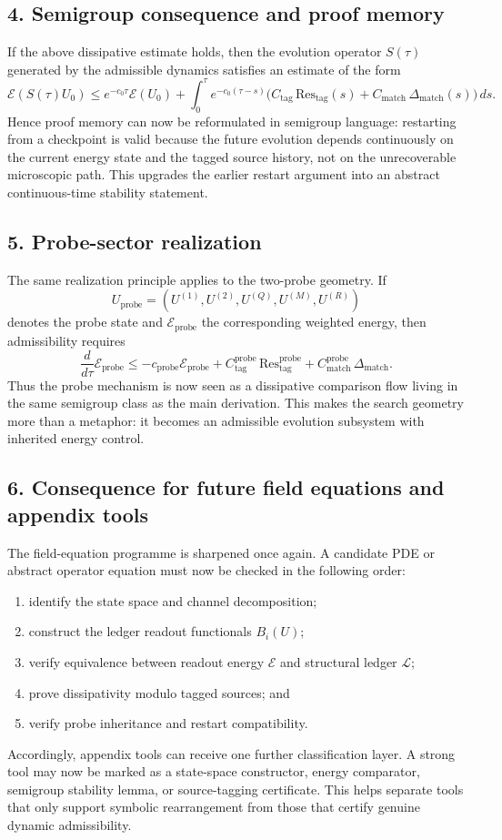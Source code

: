 \subsection*{4. Semigroup consequence and proof memory}
If the above dissipative estimate holds, then the evolution operator $S(\tau)$
generated by the admissible dynamics satisfies an estimate of the form
\[
\mathcal E(S(\tau)U_0)
\le e^{-c_0\tau}\mathcal E(U_0)
+\int_0^\tau e^{-c_0(\tau-s)}
\bigl(C_{\mathrm{tag}}\,\mathrm{Res}_{\mathrm{tag}}(s)
+ C_{\mathrm{match}}\,\Delta_{\mathrm{match}}(s)\bigr)\,ds.
\]
Hence proof memory can now be reformulated in semigroup language: restarting from a
checkpoint is valid because the future evolution depends continuously on the current
energy state and the tagged source history, not on the unrecoverable microscopic path.
This upgrades the earlier restart argument into an abstract continuous-time stability
statement.

\subsection*{5. Probe-sector realization}
The same realization principle applies to the two-probe geometry. If
\[
U_{\mathrm{probe}}=(U^{(1)},U^{(2)},U^{(Q)},U^{(M)},U^{(R)})
\]
denotes the probe state and $\mathcal E_{\mathrm{probe}}$ the corresponding weighted
energy, then admissibility requires
\[
\frac{d}{d\tau}\mathcal E_{\mathrm{probe}}
\le -c_{\mathrm{probe}}\mathcal E_{\mathrm{probe}}
+ C^{\mathrm{probe}}_{\mathrm{tag}}\,\mathrm{Res}^{\mathrm{probe}}_{\mathrm{tag}}
+ C^{\mathrm{probe}}_{\mathrm{match}}\,\Delta_{\mathrm{match}}.
\]
Thus the probe mechanism is now seen as a dissipative comparison flow living in the
same semigroup class as the main derivation. This makes the search geometry more than
a metaphor: it becomes an admissible evolution subsystem with inherited energy
control.

\subsection*{6. Consequence for future field equations and appendix tools}
The field-equation programme is sharpened once again. A candidate PDE or abstract
operator equation must now be checked in the following order:
\begin{enumerate}[label=(\arabic*)]
  \item identify the state space and channel decomposition;
  \item construct the ledger readout functionals $B_i(U)$;
  \item verify equivalence between readout energy $\mathcal E$ and structural ledger $\mathcal L$;
  \item prove dissipativity modulo tagged sources; and
  \item verify probe inheritance and restart compatibility.
\end{enumerate}
Accordingly, appendix tools can receive one further classification layer. A strong
tool may now be marked as a state-space constructor, energy comparator, semigroup
stability lemma, or source-tagging certificate. This helps separate tools that only
support symbolic rearrangement from those that certify genuine dynamic admissibility.

